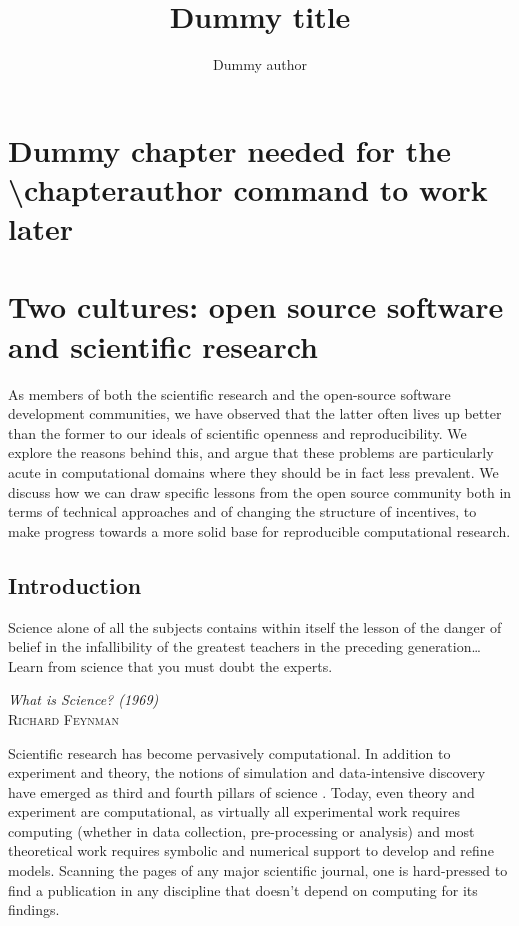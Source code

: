 \documentclass[ChapterTOCs,krantz2]{krantz} %
\begin{document}
\title{Dummy title}
\author{Dummy author}
\chapter*{Dummy chapter needed for the \textbackslash chapterauthor command to work later}

\mainmatter



\chapter{Two cultures: open source software and scientific research}

As members of both the scientific research and the open-source
software development communities, we have observed that the latter
often lives up better than the former to our ideals of scientific
openness and reproducibility.  We explore the reasons behind this,
and argue that these problems are particularly acute in computational
domains where they should be in fact less prevalent.   We discuss
how we can draw specific lessons from the open source community both
in terms of technical approaches and of changing the structure of
incentives, to make progress towards a more solid base for reproducible
computational research.

\section{Introduction}\label{intro}

\setlength{\epigraphrule}{0pt}
\setlength{\epigraphwidth}{.65\textwidth}
\epigraph%
{%
  Science alone of all the subjects contains within itself the lesson of the
  danger of belief in the infallibility of the greatest teachers in the
  preceding generation\ldots Learn from science that you must doubt the experts.
}%
{\textit{What is Science? (1969)}\\ \textsc{Richard Feynman} }

Scientific research has become pervasively computational. In addition
to experiment and theory, the notions of simulation and data-intensive
discovery have emerged as third and fourth pillars of science \cite{4th-paradigm}.
Today, even theory and experiment are computational, as virtually
all experimental work requires computing (whether in data collection,
pre-processing or analysis) and most theoretical work requires symbolic
and numerical support to develop and refine models. Scanning the pages
of any major scientific journal, one is hard-pressed to find a publication
in any discipline that doesn't depend on computing for its findings.
\end{document}
